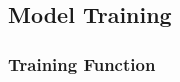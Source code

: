 \documentclass[
12pt, %
oneside, %
english, %
onehalfspacing, %
nolistspacing, %
liststotoc, %
headsepline, %
]{ProposalAndThesis} %
\begin{document}
\subsection{Model Training}
\subsubsection{Training Function}
\begin{lstlisting}[language=Python]
\end{lstlisting}
\end{document}
